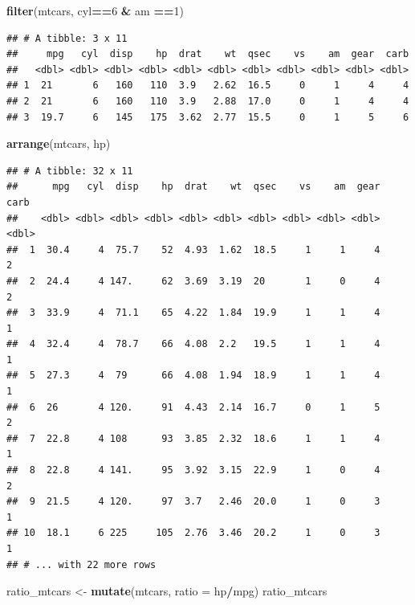 \documentclass[]{article}
\newenvironment{Shaded}{\begin{snugshade}}{\end{snugshade}}
\newcommand{\KeywordTok}[1]{\textcolor[rgb]{0.13,0.29,0.53}{\textbf{#1}}}
\newcommand{\DataTypeTok}[1]{\textcolor[rgb]{0.13,0.29,0.53}{#1}}
\newcommand{\DecValTok}[1]{\textcolor[rgb]{0.00,0.00,0.81}{#1}}
\newcommand{\StringTok}[1]{\textcolor[rgb]{0.31,0.60,0.02}{#1}}
\newcommand{\OperatorTok}[1]{\textcolor[rgb]{0.81,0.36,0.00}{\textbf{#1}}}
\newcommand{\NormalTok}[1]{#1}
\begin{document}
\begin{Shaded}
\begin{Highlighting}[]
\KeywordTok{filter}\NormalTok{(mtcars, cyl}\OperatorTok{==}\DecValTok{6} \OperatorTok{&}\StringTok{ }\NormalTok{am }\OperatorTok{==}\DecValTok{1}\NormalTok{)}
\end{Highlighting}
\end{Shaded}

\begin{verbatim}
## # A tibble: 3 x 11
##     mpg   cyl  disp    hp  drat    wt  qsec    vs    am  gear  carb
##   <dbl> <dbl> <dbl> <dbl> <dbl> <dbl> <dbl> <dbl> <dbl> <dbl> <dbl>
## 1  21       6   160   110  3.9   2.62  16.5     0     1     4     4
## 2  21       6   160   110  3.9   2.88  17.0     0     1     4     4
## 3  19.7     6   145   175  3.62  2.77  15.5     0     1     5     6
\end{verbatim}

\begin{Shaded}
\begin{Highlighting}[]
\KeywordTok{arrange}\NormalTok{(mtcars, hp)}
\end{Highlighting}
\end{Shaded}

\begin{verbatim}
## # A tibble: 32 x 11
##      mpg   cyl  disp    hp  drat    wt  qsec    vs    am  gear  carb
##    <dbl> <dbl> <dbl> <dbl> <dbl> <dbl> <dbl> <dbl> <dbl> <dbl> <dbl>
##  1  30.4     4  75.7    52  4.93  1.62  18.5     1     1     4     2
##  2  24.4     4 147.     62  3.69  3.19  20       1     0     4     2
##  3  33.9     4  71.1    65  4.22  1.84  19.9     1     1     4     1
##  4  32.4     4  78.7    66  4.08  2.2   19.5     1     1     4     1
##  5  27.3     4  79      66  4.08  1.94  18.9     1     1     4     1
##  6  26       4 120.     91  4.43  2.14  16.7     0     1     5     2
##  7  22.8     4 108      93  3.85  2.32  18.6     1     1     4     1
##  8  22.8     4 141.     95  3.92  3.15  22.9     1     0     4     2
##  9  21.5     4 120.     97  3.7   2.46  20.0     1     0     3     1
## 10  18.1     6 225     105  2.76  3.46  20.2     1     0     3     1
## # ... with 22 more rows
\end{verbatim}

\begin{Shaded}
\begin{Highlighting}[]
\NormalTok{ratio_mtcars <-}\StringTok{ }\KeywordTok{mutate}\NormalTok{(mtcars, }\DataTypeTok{ratio =}\NormalTok{ hp}\OperatorTok{/}\NormalTok{mpg)}
\NormalTok{ratio_mtcars}
\end{Highlighting}
\end{Shaded}
\end{document}
